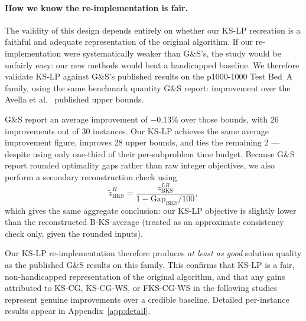 \paragraph{How we know the re-implementation is fair.}
The validity of this design depends entirely on whether our KS-LP recreation
is a faithful and adequate representation of the original algorithm.
If our re-implementation were systematically weaker than G\&S's, the study
would be unfairly easy: our new methods would beat a handicapped baseline.
We therefore validate KS-LP against G\&S's published results on the p1000-1000
Test Bed~A family, using the same benchmark quantity G\&S report: improvement
over the Avella et al.~\citep{avella2008effective} published upper bounds.

G\&S report an average improvement of $-0.13\%$ over those bounds, with 26
improvements out of 30 instances.
Our KS-LP achieves the same average improvement figure, improves 28 upper
bounds, and ties the remaining 2 --- despite using only one-third of
their per-subproblem time budget.
Because G\&S report rounded optimality gaps rather than raw integer objectives,
we also perform a secondary reconstruction check using
\[
  \tilde{z}^{H}_{\mathrm{BKS}}
  =
  \frac{z^{LB}_{\mathrm{BKS}}}
       {1-\mathrm{Gap}_{\mathrm{BKS}}/100},
\]
which gives the same aggregate conclusion: our KS-LP objective is slightly
lower than the reconstructed B-KS average (treated as an approximate
consistency check only, given the rounded inputs).

Our KS-LP re-implementation therefore produces \emph{at least as good}
solution quality as the published G\&S results on this family.
This confirms that KS-LP is a fair, non-handicapped representation of
the original algorithm, and that any gains attributed to KS-CG, KS-CG-WS,
or FKS-CG-WS in the following studies represent genuine improvements over
a credible baseline.
Detailed per-instance results appear in Appendix~\ref{app:detail}.
